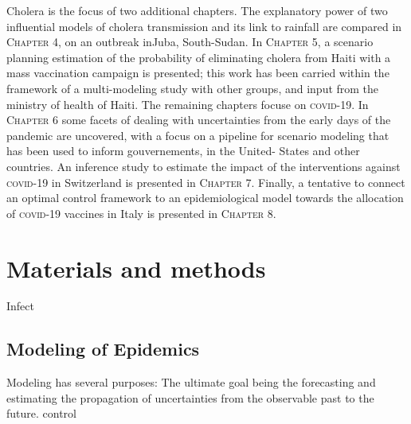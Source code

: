 Cholera is the focus of two additional chapters. The explanatory power of two influential models of cholera transmission and its link to rainfall are compared in \textsc{Chapter 4}, on an outbreak inJuba, South-Sudan. In \textsc{Chapter 5}, a scenario planning estimation of the probability of eliminating cholera from Haiti with a mass vaccination campaign is presented; this work has been carried within the framework of a multi-modeling study with other groups, and input from the ministry of health of Haiti.
The remaining chapters focuse on \textsc{covid}-19. In \textsc{Chapter 6} some facets of dealing with uncertainties from the early days of the pandemic are uncovered, with a focus on a pipeline for scenario modeling that has been used to inform gouvernements, in the United- States and other countries. 
An inference study to estimate the impact of the interventions against \textsc{covid}-19 in Switzerland is presented in \textsc{Chapter 7}.
Finally, a tentative to connect an optimal control framework to an epidemiological model towards the allocation of \textsc{covid}-19 vaccines in Italy is presented in \textsc{Chapter 8}.



\chapter[Materials and methods]{Materials and methods} %

Infect

\section{Modeling of Epidemics}
Modeling has several purposes:
The ultimate goal being  the forecasting and estimating the propagation of uncertainties from the observable past to the future. control

